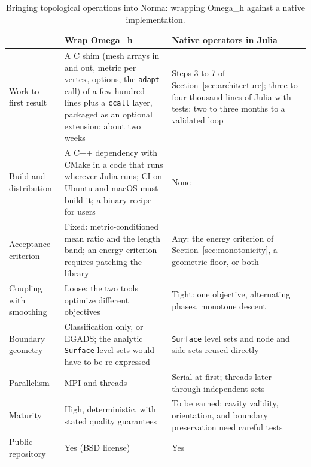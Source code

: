 \documentclass[11pt]{article}
\newcommand{\code}[1]{\texttt{#1}}
\newcommand{\omegah}{Omega\_h}
\begin{document}
\begin{table}[ht]
\centering
\small
\begin{tabular}{p{2.7cm}p{5.4cm}p{5.4cm}}
\toprule
& Wrap \omegah{} & Native operators in Julia \\
\midrule
Work to first result &
  A C shim (mesh arrays in and out, metric per vertex, options, the
  \code{adapt} call) of a few hundred lines plus a \code{ccall} layer,
  packaged as an optional extension; about two weeks &
  Steps 3 to 7 of Section~\ref{sec:architecture}; three to four
  thousand lines of Julia with tests; two to three months to a validated
  loop \\
Build and distribution &
  A C++ dependency with CMake in a code that runs wherever Julia runs;
  CI on Ubuntu and macOS must build it; a binary recipe for users &
  None \\
Acceptance criterion &
  Fixed: metric-conditioned mean ratio and the length band; an energy
  criterion requires patching the library &
  Any: the energy criterion of Section~\ref{sec:monotonicity}, a geometric
  floor, or both \\
Coupling with smoothing &
  Loose: the two tools optimize different objectives &
  Tight: one objective, alternating phases, monotone descent \\
Boundary geometry &
  Classification only, or EGADS; the analytic \code{Surface} level sets
  would have to be re-expressed &
  \code{Surface} level sets and node and side sets reused directly \\
Parallelism &
  MPI and threads &
  Serial at first; threads later through independent sets \\
Maturity &
  High, deterministic, with stated quality guarantees &
  To be earned: cavity validity, orientation, and boundary preservation
  need careful tests \\
Public repository &
  Yes (BSD license) &
  Yes \\
\bottomrule
\end{tabular}
\caption{Bringing topological operations into Norma: wrapping \omegah{}
against a native implementation.}
\label{tab:alternatives}
\end{table}
\end{document}

